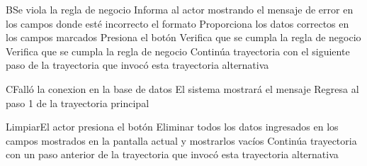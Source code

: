
\begin{UCtrayectoriaA}{B}{Se viola la regla de negocio }	
			\UCpaso[\UCsist] Informa al actor mostrando el mensaje de error  en los campos donde esté incorrecto el formato
			\UCpaso[\UCactor] Proporciona los datos correctos en los campos marcados 
			\UCpaso[\UCactor] Presiona el botón  
			\UCpaso[\UCsist] Verifica que se cumpla la regla de negocio  
			\UCpaso[\UCsist] Verifica que se cumpla la regla de negocio  
			\UCpaso[\UCsist] Continúa trayectoria con el siguiente paso de la trayectoria que invocó esta trayectoria alternativa
\end{UCtrayectoriaA}


\begin{UCtrayectoriaA}{C}{Falló la conexion en la base de datos}
			\UCpaso[\UCsist] El sistema mostrará el mensaje 
			\UCpaso[\UCsist] Regresa al paso 1 de la trayectoria principal  
\end{UCtrayectoriaA}



\begin{UCtrayectoriaA}{Limpiar}{El actor presiona el botón }
			\UCpaso[\UCsist] Eliminar todos los datos ingresados en los campos mostrados en la pantalla actual y mostrarlos vacíos
			\UCpaso[\UCsist] Continúa trayectoria con un paso anterior de la trayectoria que invocó esta trayectoria alternativa
\end{UCtrayectoriaA}